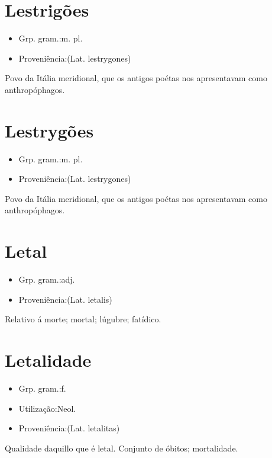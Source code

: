 \section{Lestrigões}
\begin{itemize}
\item {Grp. gram.:m. pl.}
\end{itemize}
\begin{itemize}
\item {Proveniência:(Lat. \textunderscore lestrygones\textunderscore )}
\end{itemize}
Povo da Itália meridional, que os antigos poétas nos apresentavam como anthropóphagos.
\section{Lestrygões}
\begin{itemize}
\item {Grp. gram.:m. pl.}
\end{itemize}
\begin{itemize}
\item {Proveniência:(Lat. \textunderscore lestrygones\textunderscore )}
\end{itemize}
Povo da Itália meridional, que os antigos poétas nos apresentavam como anthropóphagos.
\section{Letal}
\begin{itemize}
\item {Grp. gram.:adj.}
\end{itemize}
\begin{itemize}
\item {Proveniência:(Lat. \textunderscore letalis\textunderscore )}
\end{itemize}
Relativo á morte; mortal; lúgubre; fatídico.
\section{Letalidade}
\begin{itemize}
\item {Grp. gram.:f.}
\end{itemize}
\begin{itemize}
\item {Utilização:Neol.}
\end{itemize}
\begin{itemize}
\item {Proveniência:(Lat. \textunderscore letalitas\textunderscore )}
\end{itemize}
Qualidade daquillo que é letal.
Conjunto de óbitos; mortalidade.
